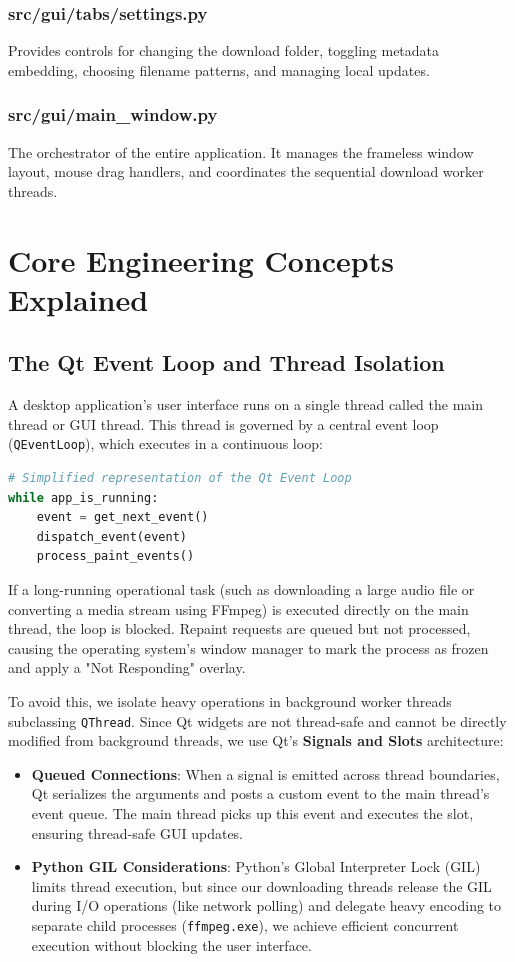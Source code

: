 \documentclass[12pt]{report}
\begin{document}
\subsection{src/gui/tabs/settings.py}
Provides controls for changing the download folder, toggling metadata embedding, choosing filename patterns, and managing local updates.

\subsection{src/gui/main\_window.py}
The orchestrator of the entire application. It manages the frameless window layout, mouse drag handlers, and coordinates the sequential download worker threads.

\newpage
\chapter{Core Engineering Concepts Explained}

\section{The Qt Event Loop and Thread Isolation}
A desktop application's user interface runs on a single thread called the main thread or GUI thread. This thread is governed by a central event loop (\texttt{QEventLoop}), which executes in a continuous loop:
\begin{lstlisting}[language=Python]
# Simplified representation of the Qt Event Loop
while app_is_running:
    event = get_next_event()
    dispatch_event(event)
    process_paint_events()
\end{lstlisting}
If a long-running operational task (such as downloading a large audio file or converting a media stream using FFmpeg) is executed directly on the main thread, the loop is blocked. Repaint requests are queued but not processed, causing the operating system's window manager to mark the process as frozen and apply a "Not Responding" overlay.

To avoid this, we isolate heavy operations in background worker threads subclassing \texttt{QThread}. Since Qt widgets are not thread-safe and cannot be directly modified from background threads, we use Qt's \textbf{Signals and Slots} architecture:
\begin{itemize}[leftmargin=*]
    \item \textbf{Queued Connections}: When a signal is emitted across thread boundaries, Qt serializes the arguments and posts a custom event to the main thread's event queue. The main thread picks up this event and executes the slot, ensuring thread-safe GUI updates.
    \item \textbf{Python GIL Considerations}: Python's Global Interpreter Lock (GIL) limits thread execution, but since our downloading threads release the GIL during I/O operations (like network polling) and delegate heavy encoding to separate child processes (\texttt{ffmpeg.exe}), we achieve efficient concurrent execution without blocking the user interface.
\end{itemize}
\end{document}
